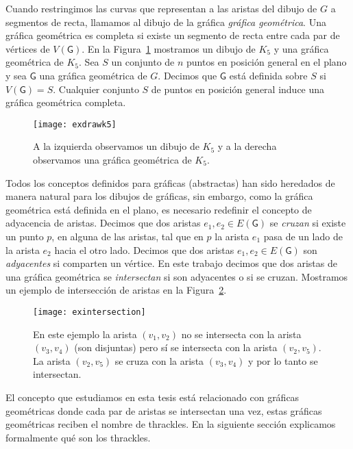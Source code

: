 Cuando restringimos las curvas que representan a las aristas del dibujo de $G$
a segmentos de recta, llamamos al dibujo de la gráfica \emph{gráfica
geométrica}. Una gráfica geométrica es completa si existe un segmento de recta
entre cada par de vértices de $V(\mathsf{G})$. En la Figura~\ref{fig:exdrawk5}
mostramos un dibujo de $K_5$ y una gráfica geométrica de $K_5$. Sea $S$ un
conjunto de $n$ puntos en posición general en el plano y sea $\mathsf{G}$
una gráfica geométrica de $G$. Decimos que $\mathsf{G}$ está definida sobre $S$
si $V(\mathsf{G}) = S$. Cualquier conjunto $S$ de puntos en posición general
induce una gráfica geométrica completa.

\begin{figure}[htpb]
  \centering
  \texttt{[image: exdrawk5]}
  \caption{A la izquierda observamos un dibujo de $K_5$ y a la derecha
  observamos una gráfica geométrica de $K_5$.}
  \label{fig:exdrawk5}
\end{figure}

Todos los conceptos definidos para gráficas (abstractas) han sido heredados de
manera natural para los dibujos de gráficas, sin embargo, como la gráfica
geométrica está definida en el plano, es necesario redefinir el concepto de
adyacencia de aristas. Decimos que dos aristas $e_1,e_2 \in E(\mathsf{G})$ se
\emph{cruzan} si existe un punto $p$, en alguna de las aristas, tal que en $p$
la arista $e_1$ pasa de un lado de la arista $e_2$ hacia el otro lado. Decimos
que dos aristas $e_1, e_2 \in E(\mathsf{G})$ son \emph{adyacentes} si comparten
un vértice. En este trabajo decimos que dos aristas de una gráfica geométrica se
\emph{intersectan} si son adyacentes o si se cruzan.
Mostramos un ejemplo de intersección de aristas en la
Figura~\ref{fig:exintersection}.
\begin{figure}[htpb]
  \centering
  \texttt{[image: exintersection]}
  \caption{En este ejemplo la arista $(v_1,v_2)$ no se intersecta con la arista
  $(v_3,v_4)$ (son disjuntas) pero sí se intersecta con la arista $(v_2,v_5)$.
  La arista $(v_2,v_5)$ se cruza con la arista $(v_3,v_4)$ y por lo tanto se
  intersectan.}
  \label{fig:exintersection}
\end{figure}

El concepto que estudiamos en esta tesis está relacionado con gráficas
geométricas donde cada par de aristas se intersectan una vez, estas gráficas
geométricas reciben el nombre de thrackles. En la siguiente sección explicamos
formalmente qué son los thrackles.

